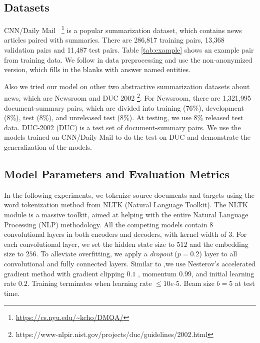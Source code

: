 \documentclass{nle}
\theoremstyle{definition}
\newcommand{\tabref}[1]{Table \ref{#1}}
\begin{document}
\subsection{Datasets}
CNN/Daily Mail~\citep{HermannKGEKSB15}
\footnote{\url{https://cs.nyu.edu/~kcho/DMQA/}} 
is a popular summarization dataset, 
which contains news articles paired with summaries.
There are 286,817 training pairs,
13,368 validation pairs and 11,487 test pairs.
\tabref{tab:example} shows an example pair from training data.
We follow \cite{SeeLM17} in data preprocessing and use 
the non-anonymized version, which fills in the blanks with answer named entities.

Also we tried our model on other two abstractive summarization datasets about news, which are Newsroom \citep{Newsroom18} and DUC 2002 \footnote{https://www-nlpir.nist.gov/projects/duc/guidelines/2002.html}. For Newsroom, there are 1,321,995 document-summary pairs, which are divided into training (76\%), development (8\%), test (8\%), and unreleased test (8\%). At testing, we use 8\% released test data. DUC-2002 (DUC) is a test set of document-summary pairs. We use the models trained on CNN/Daily Mail to do the test on DUC and demonstrate the generalization of the models.


\subsection{Model Parameters and Evaluation Metrics}
\label{sec:expset}
In the following experiments, 
we tokenize source documents and targets 
using the word tokenization method from NLTK (Natural Language Toolkit). 
The NLTK module is a massive toolkit, 
aimed at helping with the entire Natural Language Processing (NLP) methodology.
All the competing models contain $8$ convolutional layers in
both encoders and decoders, with kernel width of $3$.
For each convolutional layer, 
we set the hidden state size to $512$ and the embedding size to $256$.
To alleviate overfitting,
we apply a \textit{dropout} ($p=0.2$) layer to 
all convolutional and fully connected layers.
Similar to \citep{gehring2017convs2s},we use Nesterov's
accelerated gradient method \citep{SutskeverMDH13} with gradient clipping $0.1$ \citep{PascanuMB13}, momentum $0.99$,
and initial learning rate $0.2$.
Training terminates when learning rate $\le 10e$-$5$.
Beam size $b=5$ at test time.
\end{document}
